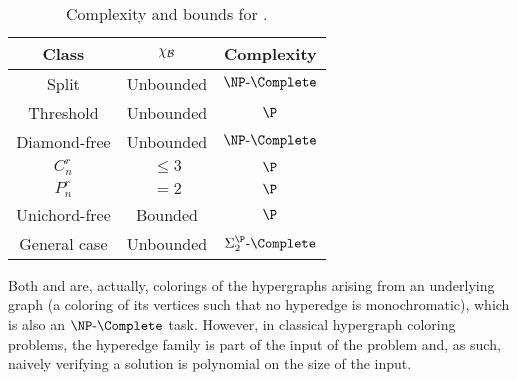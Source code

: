 \begin{table}[!htb]
    \centering
    \begin{tabular}{c|c|c}
        \hline
        \hline
        Class            & $\chi_{\mathcal{B}}$             & Complexity \\
        \hline
        Split            & Unbounded            & $\NPc$\\
        Threshold        & Unbounded            & $\P$\\
        Diamond-free     & Unbounded            & $\NPc$\\
        $C_n^r$          & $\leq 3$             & $\P$\\
        $P_n^r$          & $= 2$                & $\P$\\
        Unichord-free    & Bounded              & $\P$\\
        General case     & Unbounded            & $\SiP{2}\text{-}\Complete$\\
        \hline
        \hline
    \end{tabular}
    \caption{Complexity and bounds for .}
    \label{tab:biclique_color_complexity}
\end{table}

Both  and  are, actually, colorings of the hypergraphs arising from an underlying graph (a coloring of its vertices such that no hyperedge is monochromatic), which is also an $\NPc$ task.
However, in classical hypergraph coloring problems, the hyperedge family is part of the input of the problem and, as such, naively verifying a solution is polynomial on the size of the input.